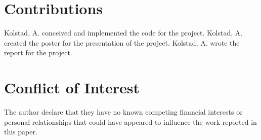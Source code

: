 \documentclass[
 reprint,
 amsmath,amssymb,
 aps,
]{revtex4-2}
\begin{document}
\section{\label{sec:Contribution}Contributions} %




\noindent
Kolstad, A. conceived and implemented the code for the project. Kolstad, A. created the poster for the presentation of the project. Kolstad, A. wrote the report for the project.



\section{\label{sec:COI}Conflict of Interest} %

\noindent
The author declare that they have no known competing financial interests or personal relationships that could have appeared to influence the work reported in this paper.
\noindent


\end{document}
